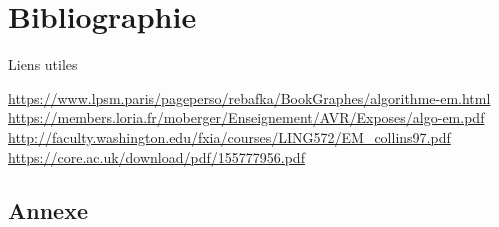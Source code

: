 \documentclass[frenchb]{report}
\newcommand{\1}{\mathbbm{1}}
\theoremstyle{definition}\newtheorem{defn}{Définition}
\theoremstyle{definition}\newtheorem{exm}{Exemple}
\theoremstyle{definition}\newtheorem{nota}{Notation}
\theoremstyle{definition}\newtheorem{rem}{Remarque}
\begin{document}
\chapter*{Bibliographie}
 
Liens utiles

\url{https://www.lpsm.paris/pageperso/rebafka/BookGraphes/algorithme-em.html} \newline
\url{https://members.loria.fr/moberger/Enseignement/AVR/Exposes/algo-em.pdf} \newline
\url{http://faculty.washington.edu/fxia/courses/LING572/EM_collins97.pdf}\newline
\url{https://core.ac.uk/download/pdf/155777956.pdf}


\pagebreak
\begin{appendix}
\chapter{Annexe}

\end{appendix}
\end{document}
